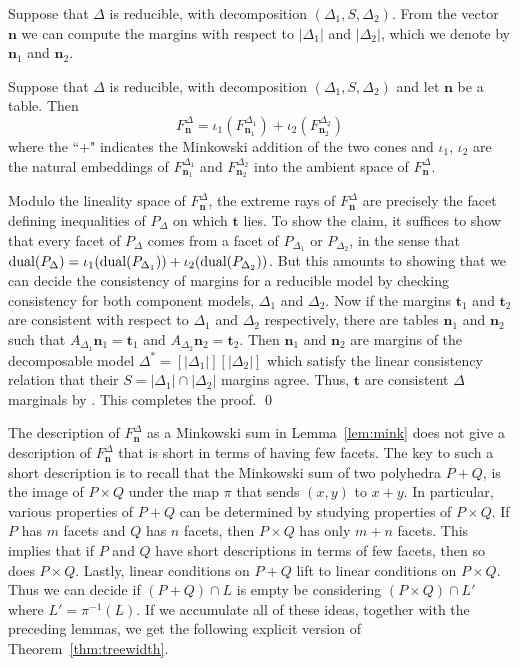 \documentclass{elsart}
\newcommand{\nn}{\mathbf{n}}
\newcommand{\ttt}{\mathbf{t}}
\begin{document}
Suppose that $\Delta$ is reducible, with decomposition $(\Delta_1,
S,\Delta_2)$.  From the vector $\nn$ we can compute the margins with
respect to $|\Delta_1|$ and $|\Delta_2|$, which we denote by 
$\nn_1$ and $\nn_2$.

\begin{lem}\label{lem:mink}
Suppose that $\Delta$ is reducible, with decomposition $(\Delta_1, S,
\Delta_2)$ and let $\nn$ be a table.  Then
\[
F^\Delta_\nn = \iota_1(F^{\Delta_1}_{\nn_1}) +\iota_2(F^{\Delta_2}_{\nn_2})
\]
where the ``+"  indicates the Minkowski addition of the two
cones and $\iota_1$, $\iota_2$ are the natural embeddings of
$F^{\Delta_1}_{\nn_1}$ and $F^{\Delta_2}_{\nn_2}$ into the ambient
space of $F^\Delta_\nn$.
\end{lem}
\begin{pf}
Modulo the lineality space of $F^\Delta_\nn$, the extreme rays of
$F^\Delta_\nn$ are precisely the facet defining inequalities of
$P_\Delta$ on which $\ttt$ lies.  To show the claim, it suffices to
show that every facet of $P_\Delta$ comes from a facet of $P_{\Delta_1}$
or $P_{\Delta_2}$, in the sense that ${\rm dual}(P_\Delta) =
\iota_1({\rm dual}(P_{\Delta_1})) + \iota_2({\rm
dual}(P_{\Delta_2}))$.  But this amounts to showing 
that we can decide  
the  consistency of
margins for a reducible model  by checking consistency
for both component models, $\Delta_1$ and $\Delta_2$.  Now if
the margins $\ttt_1$ and $\ttt_2$ are consistent with respect to
$\Delta_1$ and $\Delta_2$ respectively, there are tables $\nn_1$ and
$\nn_2$ such that $A_{\Delta_1} \nn_1 = \ttt_1$ and $A_{\Delta_2} \nn_2
= \ttt_2$.  Then $\nn_1$ and $\nn_2$ are margins of the decomposable
model $\Delta^* = [ |\Delta_1|][|\Delta_2|]$ which satisfy the linear
consistency relation that their $S = |\Delta_1| \cap |\Delta_2|$
margins agree.  Thus, $\mathbf{t}$ are consistent $\Delta$ marginals by
\citet{LAU96}.  This completes the proof. \qed 
\end{pf}
The description of $F^\Delta_\nn$ as a Minkowski sum in Lemma~\ref{lem:mink}
does not give a description of $F^\Delta_\nn$ that is
short in terms of having few facets.  The key to
such a short description is to recall that the Minkowski sum of two
polyhedra $P + Q$, is the image of $P \times Q$ under the map $\pi$ that
sends $(x,y)$ to $x + y$.  In particular, various properties of $P + Q$
can be determined by studying properties of $P \times Q$.  If
$P$ has $m$ facets and $Q$ has $n$ facets, then $P \times Q$ has only
$m + n$ facets.   This implies that if $P$ and $Q$ have short
descriptions in terms of few facets, then so does $P \times Q$.
Lastly, linear conditions on $P + Q$ lift to linear
conditions on $P \times Q$.  Thus we can  decide if $(P + Q) \cap L$ is empty 
be considering  $(P \times Q) \cap L'$ where $L' = \pi^{-1}(L)$.
If we accumulate all of these ideas,
together with the preceding lemmas, we get the following explicit
version of Theorem~\ref{thm:treewidth}.  
\end{document}
